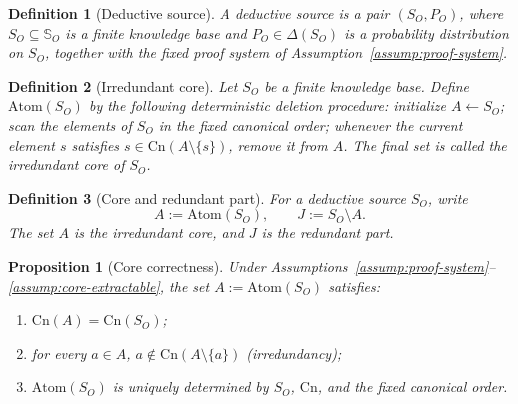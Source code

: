 \documentclass[journal,onecolumn]{IEEEtran}
\newcommand{\Atom}{\text{Atom}}
\newcommand{\Cn}{\text{Cn}}
\newtheorem{proposition}{Proposition}[section]
\newtheorem{definition}{Definition}[section]
\numberwithin{equation}{section}
\begin{document}
\begin{definition}[Deductive source]
\label{def:deductive-source}
A \emph{deductive source} is a pair \((S_O,P_O)\), where
\(S_O\subseteq\mathbb{S}_O\) is a finite knowledge base and
\(P_O\in\Delta(S_O)\) is a probability distribution on \(S_O\),
together with the fixed proof system of
Assumption~\ref{assump:proof-system}.
\end{definition}

\begin{definition}[Irredundant core]
\label{def:atom-so}
Let \(S_O\) be a finite knowledge base.
Define \(\Atom(S_O)\) by the following deterministic deletion
procedure:
initialize \(A\gets S_O\); scan the elements of \(S_O\) in the
fixed canonical order; whenever the current element \(s\) satisfies
\(s\in\Cn(A\setminus\{s\})\), remove it from \(A\).
The final set is called the \emph{irredundant core} of \(S_O\).
\end{definition}

\begin{definition}[Core and redundant part]
\label{def:intrinsic-operational-bases}
For a deductive source \(S_O\), write
\[
  A:=\Atom(S_O),
  \qquad
  J:=S_O\setminus A.
\]
The set \(A\) is the \emph{irredundant core}, and \(J\) is the
\emph{redundant part}.
\end{definition}

\begin{proposition}[Core correctness]
\label{prop:atom-core-correct}
Under
Assumptions~\textup{\ref{assump:proof-system}}--\textup{\ref{assump:core-extractable}},
the set \(A:=\Atom(S_O)\) satisfies:
\begin{enumerate}[label=\textup{(\roman*)}]
  \item \(\Cn(A)=\Cn(S_O)\);
  \item for every \(a\in A\),
        \(a\notin\Cn(A\setminus\{a\})\)
        \textup{(irredundancy)};
  \item \(\Atom(S_O)\) is uniquely determined by
        \(S_O\), \(\Cn\), and the fixed canonical order.
\end{enumerate}
\end{proposition}
\end{document}
